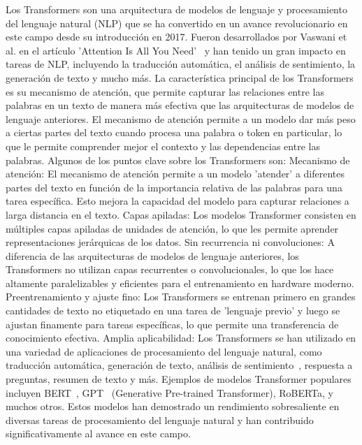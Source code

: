 Los Transformers son una arquitectura de modelos de lenguaje y procesamiento del lenguaje natural (NLP)
que se ha convertido en un avance revolucionario en este campo desde su introducción en 2017.
Fueron desarrollados por Vaswani et al. en el artículo 'Attention Is All You Need'~\cite{vaswani2023attention} 
y han tenido un gran impacto en tareas de NLP, incluyendo la traducción automática, el análisis de sentimiento, la generación de texto y mucho más.
La característica principal de los Transformers es su mecanismo de atención, que permite capturar las relaciones entre las palabras en un texto de manera más efectiva que las arquitecturas de modelos de lenguaje anteriores. El mecanismo de atención permite a un modelo dar más peso a ciertas partes del texto cuando procesa una palabra o token en particular, lo que le permite comprender mejor el contexto y las dependencias entre las palabras.
Algunos de los puntos clave sobre los Transformers son:
Mecanismo de atención: El mecanismo de atención permite a un modelo 'atender' a diferentes partes del texto en función de la importancia relativa de las palabras para una tarea específica. Esto mejora la capacidad del modelo para capturar relaciones a larga distancia en el texto.
Capas apiladas: Los modelos Transformer consisten en múltiples capas apiladas de unidades de atención, lo que les permite aprender representaciones jerárquicas de los datos.
Sin recurrencia ni convoluciones: A diferencia de las arquitecturas de modelos de lenguaje anteriores, los Transformers no utilizan capas recurrentes o convolucionales, lo que los hace altamente paralelizables y eficientes para el entrenamiento en hardware moderno.
Preentrenamiento y ajuste fino: Los Transformers se entrenan primero en grandes cantidades de texto no etiquetado en una tarea de 'lenguaje previo' y luego se ajustan finamente para tareas específicas, lo que permite una transferencia de conocimiento efectiva.
Amplia aplicabilidad: Los Transformers se han utilizado en una variedad de aplicaciones de procesamiento del lenguaje natural, como traducción automática, generación de texto, análisis de sentimiento~\cite{UrdanetaTransformers}, respuesta a preguntas, resumen de texto y más.
Ejemplos de modelos Transformer populares incluyen BERT~\cite{devlin2019bert}, GPT~\cite{chatgpt1} (Generative Pre-trained Transformer), RoBERTa, y muchos otros. Estos modelos han demostrado un rendimiento sobresaliente en diversas tareas de procesamiento del lenguaje natural y han contribuido significativamente al avance en este campo.



